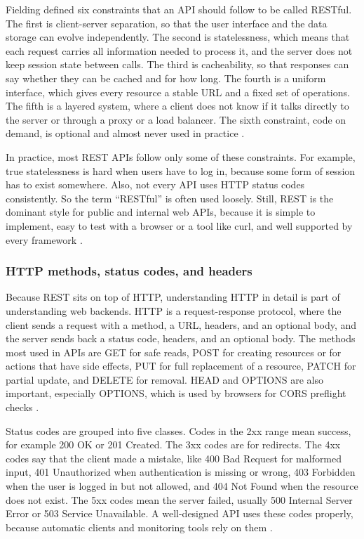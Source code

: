 Fielding defined six constraints that an API should follow to be called RESTful. The first is client-server separation, so that the user interface and the data storage can evolve independently. The second is statelessness, which means that each request carries all information needed to process it, and the server does not keep session state between calls. The third is cacheability, so that responses can say whether they can be cached and for how long. The fourth is a uniform interface, which gives every resource a stable URL and a fixed set of operations. The fifth is a layered system, where a client does not know if it talks directly to the server or through a proxy or a load balancer. The sixth constraint, code on demand, is optional and almost never used in practice \autocite{toman2020rest_soap, stepien2025rest_graphql}.

In practice, most REST APIs follow only some of these constraints. For example, true statelessness is hard when users have to log in, because some form of session has to exist somewhere. Also, not every API uses HTTP status codes consistently. So the term \enquote{RESTful} is often used loosely. Still, REST is the dominant style for public and internal web APIs, because it is simple to implement, easy to test with a browser or a tool like curl, and well supported by every framework \autocite{addanki2025api_shifts, toman2020rest_soap}.

\subsubsection{HTTP methods, status codes, and headers}
\label{sec:http-details}

Because REST sits on top of HTTP, understanding HTTP in detail is part of understanding web backends. HTTP is a request-response protocol, where the client sends a request with a method, a URL, headers, and an optional body, and the server sends back a status code, headers, and an optional body. The methods most used in APIs are GET for safe reads, POST for creating resources or for actions that have side effects, PUT for full replacement of a resource, PATCH for partial update, and DELETE for removal. HEAD and OPTIONS are also important, especially OPTIONS, which is used by browsers for CORS preflight checks \autocite{toman2020rest_soap}.

Status codes are grouped into five classes. Codes in the 2xx range mean success, for example 200 OK or 201 Created. The 3xx codes are for redirects. The 4xx codes say that the client made a mistake, like 400 Bad Request for malformed input, 401 Unauthorized when authentication is missing or wrong, 403 Forbidden when the user is logged in but not allowed, and 404 Not Found when the resource does not exist. The 5xx codes mean the server failed, usually 500 Internal Server Error or 503 Service Unavailable. A well-designed API uses these codes properly, because automatic clients and monitoring tools rely on them \autocite{koziel2020rest_auth_security}.

